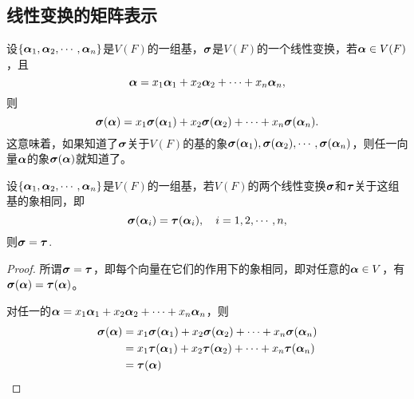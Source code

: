 \subsection{线性变换的矩阵表示}

\begin{frame}
  设$\{\alphabd_1,\alphabd_2,\cd,\alphabd_n\}$是$V(F)$的一组基，$\sigmabd$是$V(F)$的一个线性变换，若$\alphabd\in V(F)$，且
  $$
  \alphabd=x_1\alphabd_1+x_2\alphabd_2+\cd+x_n\alphabd_n,
  $$
  则
  $$
  \sigmabd(\alphabd)=x_1\sigmabd(\alphabd_1)+x_2\sigmabd(\alphabd_2)+\cd+x_n\sigmabd(\alphabd_n).
  $$
  这意味着，如果知道了$\sigmabd$关于$V(F)$的基的象$\sigmabd(\alphabd_1),\sigmabd(\alphabd_2),\cd,\sigmabd(\alphabd_n)$，则任一向量$\alphabd$的象$\sigmabd(\alphabd)$就知道了。
\end{frame}

\begin{frame}
  \begin{dingli}
    设$\{\alphabd_1,\alphabd_2,\cd,\alphabd_n\}$是$V(F)$的一组基，若$V(F)$的两个线性变换$\sigmabd$和$\taubd$关于这组基的象相同，即
    $$
    \sigmabd(\alphabd_i)=\taubd(\alphabd_i), \quad i=1,2,\cd,n,
    $$
    则$\sigmabd=\taubd$.
  \end{dingli}
  \vspace{.1in}\pause 

  \begin{proof}
    所谓$\sigmabd=\taubd$，即每个向量在它们的作用下的象相同，即对任意的$\alphabd\in V$，有$\sigmabd(\alphabd)=\taubd(\alphabd)$。\vspace{.1in}\pause 

    对任一的$\alphabd=x_1\alphabd_1+x_2\alphabd_2+\cd+x_n\alphabd_n$，则
    $$
    \begin{aligned}
      \sigmabd(\alphabd)
      &=x_1\sigmabd(\alphabd_1)+x_2\sigmabd(\alphabd_2)+\cd+x_n\sigmabd(\alphabd_n)\\
      &=x_1\taubd(\alphabd_1)+x_2\taubd(\alphabd_2)+\cd+x_n\taubd(\alphabd_n)\\
      &=\taubd(\alphabd)
  \end{aligned}
    $$
  \end{proof}
\end{frame}

